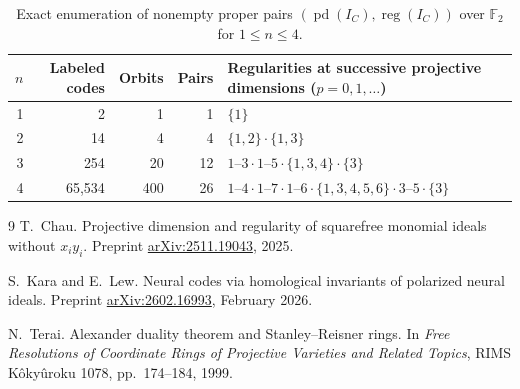 \documentclass[11pt]{article}
\theoremstyle{plain}
\theoremstyle{definition}
\theoremstyle{remark}
\DeclareMathOperator{\pd}{pd}
\DeclareMathOperator{\reg}{reg}
\begin{document}
\begin{table}[h]
\centering
\small
\begin{tabular}{@{}rrrrl@{}}
\toprule
$n$ & Labeled codes & Orbits & Pairs & Regularities at successive projective dimensions ($p=0,1,\dots$) \\
\midrule
1 & 2      & 1   & 1  & $\{1\}$ \\
2 & 14     & 4   & 4  & $\{1,2\}\cdot\{1,3\}$ \\
3 & 254    & 20  & 12 & $1\text{--}3\cdot 1\text{--}5\cdot\{1,3,4\}\cdot\{3\}$ \\
4 & 65,534 & 400 & 26 & $1\text{--}4\cdot 1\text{--}7\cdot 1\text{--}6\cdot\{1,3,4,5,6\}\cdot 3\text{--}5\cdot\{3\}$ \\
\bottomrule
\end{tabular}
\caption{Exact enumeration of nonempty proper pairs $(\pd(I_C),\reg(I_C))$ over $\mathbb{F}_2$ for $1 \le n \le 4$.}\label{tab:orbits}
\end{table}

\begin{thebibliography}{9}
T.~Chau.
Projective dimension and regularity of squarefree monomial ideals without $x_i y_i$.
Preprint \href{https://arxiv.org/abs/2511.19043}{arXiv:2511.19043}, 2025.

S.~Kara and E.~Lew.
Neural codes via homological invariants of polarized neural ideals.
Preprint \href{https://arxiv.org/abs/2602.16993}{arXiv:2602.16993}, February 2026.

N.~Terai.
Alexander duality theorem and Stanley--Reisner rings.
In \emph{Free Resolutions of Coordinate Rings of Projective Varieties and Related Topics}, RIMS K\^oky\^uroku 1078, pp.~174--184, 1999.
\end{thebibliography}
\end{document}
